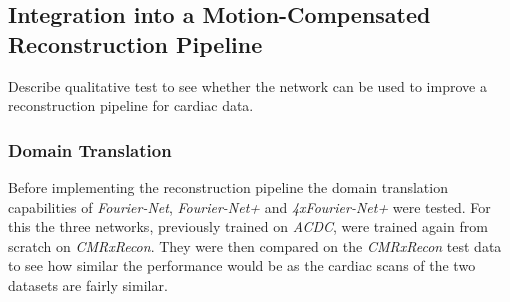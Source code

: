 %

\subsection{Integration into a Motion-Compensated Reconstruction Pipeline} \label{SubSec:IntegrationMotion-CompensatedReconstructionPipeline}
Describe qualitative test to see whether the network can be used to improve a reconstruction pipeline for cardiac data.

\subsubsection{Domain Translation} \label{SubSubSec:DomainTranslation}
Before implementing the reconstruction pipeline the domain translation capabilities of \emph{Fourier-Net}, \emph{Fourier-Net+} and \emph{4xFourier-Net+} were tested. For this the three networks, previously trained on \emph{ACDC}, were trained again from scratch on \emph{CMRxRecon}. They were then compared on the \emph{CMRxRecon} test data to see how similar the performance would be as the cardiac scans of the two datasets are fairly similar.

